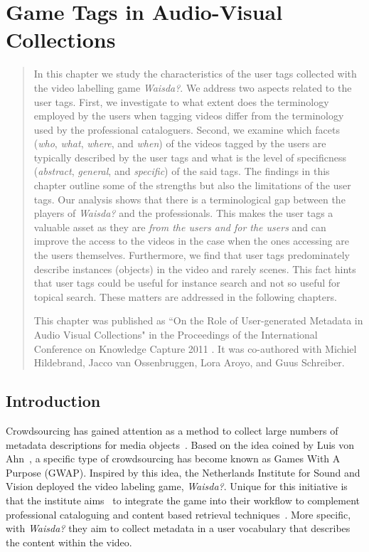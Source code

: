 \chapter{Game Tags in Audio-Visual Collections}\label{chap:kcap}
\begin{quotation}
\noindent
In this chapter we study the characteristics of the user tags collected with the video labelling game \textit{Waisda?}. We address two aspects related to the user tags. First, we investigate to what extent does the terminology employed by the users when tagging videos differ from the terminology used by the professional cataloguers. Second, we examine which facets (\textit{who}, \textit{what}, \textit{where}, and \textit{when}) of the videos tagged by the users are typically described by the user tags and what is the level of specificness (\textit{abstract}, \textit{general}, and \textit{specific}) of the said tags. 
The findings in this chapter outline some of the strengths but also the limitations of the user tags. Our analysis shows that there is a terminological gap between the players of \textit{Waisda?} and the professionals. This makes the user tags a valuable asset as they are \textit{from the users and for the users} and can improve the access to the videos in the case when the ones accessing are the users themselves. Furthermore,  we find that user tags predominately describe instances (objects) in the video and rarely scenes. 
This fact hints that user tags could be useful for instance search and not so useful for topical search. These matters are addressed in the following chapters.

This chapter was published as ``On the Role of User-generated Metadata in Audio Visual Collections" in the Proceedings of the International Conference on Knowledge Capture 2011 \cite{kcap}. It was co-authored with Michiel Hildebrand, Jacco van Ossenbruggen, Lora Aroyo, and Guus Schreiber. 
\end{quotation}

\section{Introduction}

Crowdsourcing has gained attention as a method to collect large numbers of
metadata descriptions for media
objects~\cite{MATW2007:Chan,MATW2009:Leason,FlickrCommons}. Based on the idea
coined by Luis von Ahn~\cite{gwap}, a specific type of crowdsourcing has
become known as Games With A Purpose (GWAP). Inspired by this idea, the
Netherlands Institute for Sound and Vision deployed the video labeling game,
\emph{Waisda?}. Unique for this initiative is that the institute
aims~\cite{johanwebsci} to integrate the game into their workflow to
complement professional cataloguing and content based retrieval
techniques~\cite{ISR2009:hollink}. More specific, with \emph{Waisda?} they aim
to collect metadata in a user vocabulary that describes the content within the
video.


